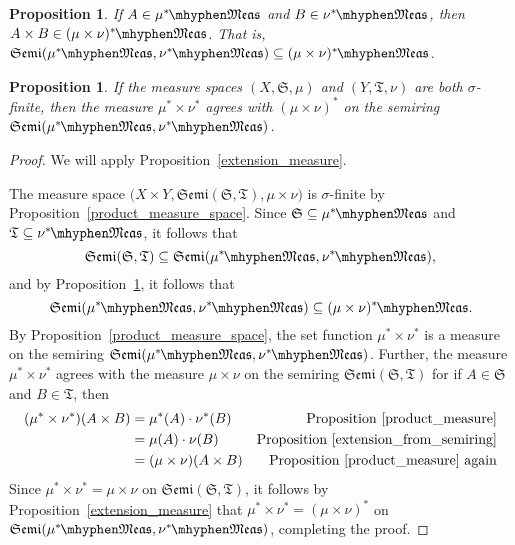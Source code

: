 \documentclass[
twoside=true,
paper=letter,
fontsize=9pt,
pagesize=auto,
leqno,
openany,
headsepline,
overfullrule,
]{scrbook}
\theoremstyle{plain}
\theoremstyle{plain}
\newtheorem{prop}[thm]{Proposition}
\theoremstyle{definition}
\theoremstyle{bfnoteitalic}
\theoremstyle{bfnoteroman}
\newcommand{\sigalg}[1]{\mathfrak{#1}}
\newcommand{\textsigma}{\hbox{\large{$\sigma$}}\kern-1pt}
\newcommand{\semiring}{\sigalg{S}}
\newcommand{\semiringii}{\sigalg{T}}
\newcommand{\productsemiring}[2]{\mathfrak{Semi}(#1,#2)}
\newcommand{\measurable}[1]{{#1}\mhyphen\mathfrak{Meas}}
\newcommand{\kernast}{\ast\kern-1pt}
\newcommand{\measurespace}{X}
\newcommand{\measurespaceii}{Y}
\newcommand{\measure}{\mu}
\newcommand{\measureii}{\nu}
\newcommand{\seti}{A}
\newcommand{\setii}{B}
\begin{document}
\begin{prop}\label{semiring_inclusion}
If
$\seti\in\measurable{\measure^\kernast}$ and 
$\setii\in\measurable{\measureii^\kernast}$, then
$\seti\times\setii \in \measurable{(\measure\times\measureii)^\kernast}$.  
That is,
$\productsemiring{\measurable{\measure^\kernast}}{\measurable{\measureii^\kernast}}
\subseteq
\measurable{(\measure\times\measureii)^\kernast}$.
\end{prop}


\begin{prop}\label{agreeable_product_measures}
If the measure spaces
$(\measurespace, \semiring, \measure)$
and
$(\measurespaceii, \semiringii, \measureii)$ 
are both \textsigma\hyp{}finite, then the measure
$\measure^*\times\measureii^*$ agrees with
$(\measure\times\measureii)^*$ on the semiring
$\productsemiring{\measurable{\measure^\kernast}}{\measurable{\measureii^\kernast}}$.
\end{prop}

\begin{proof}
We will apply Proposition~\ref{extension_measure}.

The measure space  
$\bigl(\measurespace\times\measurespaceii, 
\productsemiring{\semiring}{\semiringii}, 
\measure\times\measureii\bigr)$ is \textsigma\hyp{}finite by Proposition~\ref{product_measure_space}.
Since
$\semiring\subseteq \measurable{\measure^\kernast}$
and
$\semiringii\subseteq \measurable{\measureii^\kernast}$, it follows that
\[
\productsemiring{\semiring}{\semiringii}
\subseteq
\productsemiring{\measurable{\measure^\kernast}}{\measurable{\measureii^\kernast}},
\]
and by Proposition~\ref{semiring_inclusion}, it follows that
\[
\productsemiring{\measurable{\measure^\kernast}}{\measurable{\measureii^\kernast}}
\subseteq
\measurable{(\measure\times\measureii)^\kernast}.
\]
By Proposition~\ref{product_measure_space}, the set function 
$\measure^*\times\measureii^*$
is a measure on the semiring
$\productsemiring{\measurable{\measure^\kernast}}{\measurable{\measureii^\kernast}}$.
Further, the measure 
$\measure^*\times\measureii^*$
agrees with the measure
$\measure\times\measureii$ on the semiring
$\productsemiring{\semiring}{\semiringii}$ for if 
$\seti\in\semiring$ and $\setii\in\semiringii$, then 
\begin{align*}
(\measure^*\times\measureii^*)(\seti\times\setii)
& = \measure^*(\seti)\cdot\measureii^*(\setii)
&\text{Proposition~\ref{product_measure}} 
\\
& = \measure(\seti)\cdot\measureii(\setii)
&\text{Proposition~\ref{extension_from_semiring}}
\\
& =(\measure\times\measureii)(\seti\times\setii)
&\text{Proposition~\ref{product_measure} again}
\\
\end{align*}
Since  
$\measure^*\times\measureii^*
=
\measure\times\measureii$ on 
$\productsemiring{\semiring}{\semiringii}$, 
it follows by Proposition~\ref{extension_measure} that 
$\measure^*\times\measureii^*
=
(\measure\times\measureii)^*$ on
$\productsemiring{\measurable{\measure^\kernast}}{\measurable{\measureii^\kernast}}$,
completing the proof. 
\end{proof}
\end{document}
